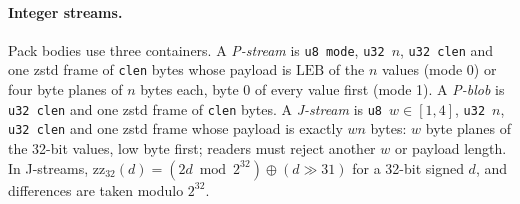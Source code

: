 \paragraph{Integer streams.}
Pack bodies use three containers. A \emph{P-stream} is \texttt{u8 mode}, \texttt{u32}~$n$, \texttt{u32 clen} and one
zstd frame of \texttt{clen} bytes whose payload is $\mathrm{LEB}$ of the $n$ values (mode 0) or four byte planes of $n$
bytes each, byte 0 of every value first (mode 1). A \emph{P-blob} is \texttt{u32 clen} and one zstd frame of
\texttt{clen} bytes. A \emph{J-stream} is \texttt{u8}~$w\in[1,4]$, \texttt{u32}~$n$, \texttt{u32 clen} and one zstd
frame whose payload is exactly $wn$ bytes: $w$ byte planes of the 32-bit values, low byte first; readers must reject
another $w$ or payload length. In J-streams, $\mathrm{zz}_{32}(d)=(2d\bmod 2^{32})\oplus(d\gg 31)$ for a 32-bit signed
$d$, and differences are taken modulo $2^{32}$.

